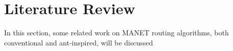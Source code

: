 \newcommand{\tab}{\hspace*{2em}}
\chapter{Literature Review} 
\noindent In this section, some related work on MANET routing algorithms, both conventional and ant-inspired, will be discussed

